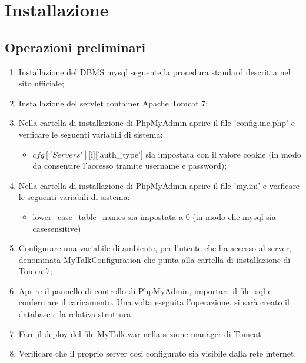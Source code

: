 \section{Installazione}
\subsection{Operazioni preliminari}
\begin{enumerate}
\item Installazione del DBMS mysql seguente la procedura standard descritta nel sito ufficiale;
\item Installazione del servlet container Apache Tomcat 7;
\item Nella cartella di installazione di PhpMyAdmin aprire il file 'config.inc.php' e verficare le seguenti variabili di sistema:
\begin{itemize}
\item $cfg['Servers'][$i]['auth_type'] sia impostata con il valore cookie (in modo da consentire l'accesso tramite username e password);
\end{itemize}
\item Nella cartella di installazione di PhpMyAdmin aprire il file 'my.ini' e verficare le seguenti variabili di sistema:
\begin{itemize}
\item lower_case_table_names sia impostata a 0 (in modo che mysql sia casesensitive)
\end{itemize}
\item Configurare una variabile di ambiente, per l'utente che ha accesso al server, denominata MyTalkConfiguration che punta alla cartella di installazione di Tomcat7;
\item Aprire il pannello di controllo di PhpMyAdmin, importare il file .sql e confermare il caricamento. Una volta eseguita l'operazione, si sarà creato il database e la relativa struttura.
\item Fare il deploy del file MyTalk.war nella sezione manager di Tomcat
\item Verificare che il proprio server cosi configurato sia visibile dalla rete internet.
\end{enumerate}


